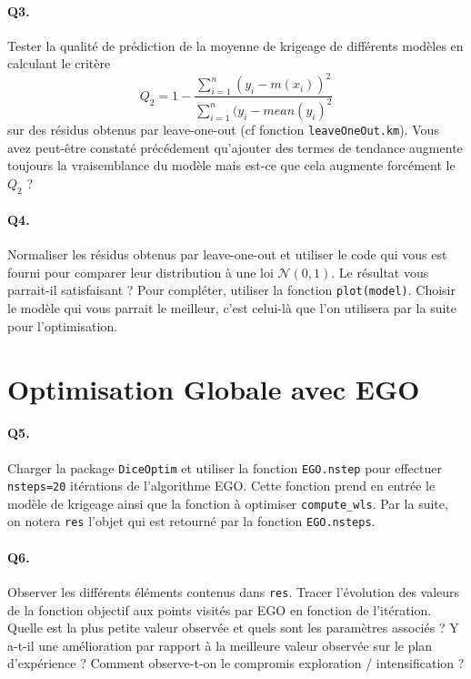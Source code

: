 \documentclass[12pt]{scrartcl}
\begin{document}
\paragraph{Q3. } Tester la qualité de prédiction de la moyenne de krigeage de différents modèles en calculant le critère 
$$Q_2 = 1 - \frac{\sum_{i=1}^n (y_i - m(x_i))^2}{\sum_{i=1}^n (y_i - mean(y_i)^2}$$
sur des résidus obtenus par leave-one-out (cf fonction \texttt{leaveOneOut.km}). Vous avez peut-être constaté précédement qu'ajouter des termes de tendance augmente toujours la vraisemblance du modèle mais est-ce que cela augmente forcément le $Q_2$ ? 

\paragraph{Q4. } Normaliser les résidus obtenus par leave-one-out et utiliser le code qui vous est fourni pour comparer leur distribution à une loi $\mathcal{N}(0, 1)$. 
Le résultat vous parrait-il satisfaisant ? Pour compléter, utiliser la fonction \texttt{plot(model)}. Choisir le modèle qui vous parrait le meilleur, c'est celui-là que l'on utilisera par la suite pour l'optimisation.

\section{Optimisation Globale avec EGO}

\paragraph{Q5. } Charger la package \texttt{DiceOptim} et utiliser la fonction \texttt{EGO.nstep} pour effectuer \texttt{nsteps=20} itérations de l'algorithme EGO. 
Cette fonction prend en entrée le modèle de krigeage ainsi que la fonction à optimiser \texttt{compute\_wls}. Par la suite, on notera \texttt{res} l'objet qui est retourné par la fonction \texttt{EGO.nsteps}.

\paragraph{Q6. } Observer les différents éléments contenus dans \texttt{res}. Tracer l'évolution des valeurs de la fonction objectif aux points visités par EGO en fonction de l'itération. 
Quelle est la plus petite valeur observée et quels sont les paramètres associés ? Y a-t-il une amélioration par rapport à la meilleure valeur observée sur le plan d'expérience ?
Comment observe-t-on le compromis exploration / intensification ?
\end{document}
